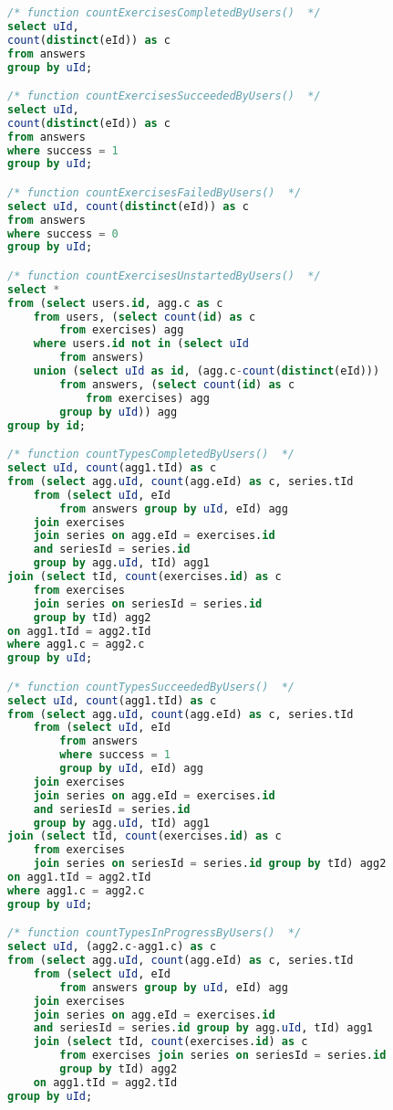 \begin{lstlisting}[language=sql]
/* function countExercisesCompletedByUsers()  */
select uId,
count(distinct(eId)) as c
from answers
group by uId;

/* function countExercisesSucceededByUsers()  */
select uId,
count(distinct(eId)) as c
from answers
where success = 1
group by uId;

/* function countExercisesFailedByUsers()  */
select uId, count(distinct(eId)) as c
from answers
where success = 0
group by uId;

/* function countExercisesUnstartedByUsers()  */
select *
from (select users.id, agg.c as c
    from users, (select count(id) as c
        from exercises) agg
    where users.id not in (select uId
        from answers)
    union (select uId as id, (agg.c-count(distinct(eId)))
        from answers, (select count(id) as c
            from exercises) agg
        group by uId)) agg
group by id;

/* function countTypesCompletedByUsers()  */
select uId, count(agg1.tId) as c
from (select agg.uId, count(agg.eId) as c, series.tId
    from (select uId, eId
        from answers group by uId, eId) agg
    join exercises
    join series on agg.eId = exercises.id
    and seriesId = series.id
    group by agg.uId, tId) agg1
join (select tId, count(exercises.id) as c
    from exercises
    join series on seriesId = series.id
    group by tId) agg2
on agg1.tId = agg2.tId
where agg1.c = agg2.c
group by uId;

/* function countTypesSucceededByUsers()  */
select uId, count(agg1.tId) as c
from (select agg.uId, count(agg.eId) as c, series.tId
    from (select uId, eId
        from answers
        where success = 1
        group by uId, eId) agg
    join exercises
    join series on agg.eId = exercises.id
    and seriesId = series.id
    group by agg.uId, tId) agg1
join (select tId, count(exercises.id) as c
    from exercises
    join series on seriesId = series.id group by tId) agg2
on agg1.tId = agg2.tId
where agg1.c = agg2.c
group by uId;

/* function countTypesInProgressByUsers()  */
select uId, (agg2.c-agg1.c) as c
from (select agg.uId, count(agg.eId) as c, series.tId
    from (select uId, eId
        from answers group by uId, eId) agg
    join exercises
    join series on agg.eId = exercises.id
    and seriesId = series.id group by agg.uId, tId) agg1
    join (select tId, count(exercises.id) as c
        from exercises join series on seriesId = series.id
        group by tId) agg2
    on agg1.tId = agg2.tId
group by uId;


\end{lstlisting}
